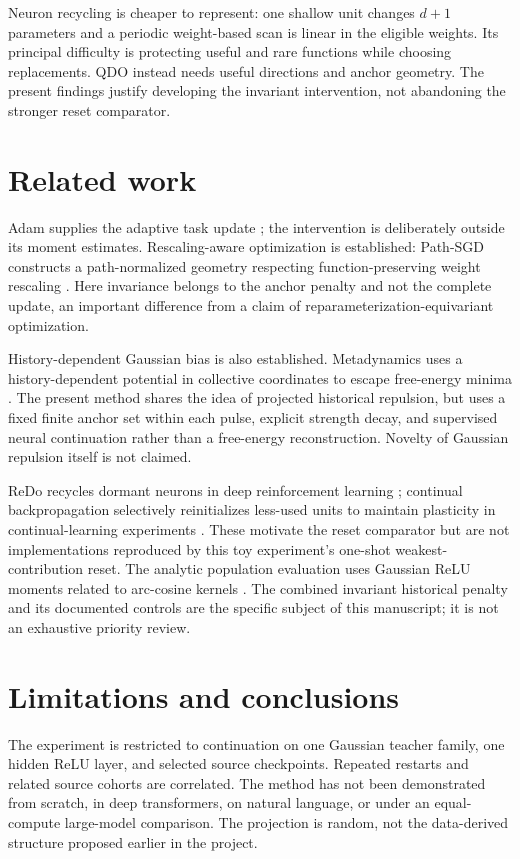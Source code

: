 \documentclass[11pt,letterpaper]{article}
\theoremstyle{remark}\newtheorem{remark}{Remark}
\begin{document}
Neuron recycling is cheaper to represent: one shallow unit changes $d+1$ parameters and a periodic weight-based scan is linear in the eligible weights. Its principal difficulty is protecting useful and rare functions while choosing replacements. QDO instead needs useful directions and anchor geometry. The present findings justify developing the invariant intervention, not abandoning the stronger reset comparator.

\section{Related work}
Adam supplies the adaptive task update \cite{adam}; the intervention is deliberately outside its moment estimates. Rescaling-aware optimization is established: Path-SGD constructs a path-normalized geometry respecting function-preserving weight rescaling \cite{pathsgd}. Here invariance belongs to the anchor penalty and not the complete update, an important difference from a claim of reparameterization-equivariant optimization.

History-dependent Gaussian bias is also established. Metadynamics uses a history-dependent potential in collective coordinates to escape free-energy minima \cite{metadynamics}. The present method shares the idea of projected historical repulsion, but uses a fixed finite anchor set within each pulse, explicit strength decay, and supervised neural continuation rather than a free-energy reconstruction. Novelty of Gaussian repulsion itself is not claimed.

ReDo recycles dormant neurons in deep reinforcement learning \cite{redo}; continual backpropagation selectively reinitializes less-used units to maintain plasticity in continual-learning experiments \cite{plasticity}. These motivate the reset comparator but are not implementations reproduced by this toy experiment's one-shot weakest-contribution reset. The analytic population evaluation uses Gaussian ReLU moments related to arc-cosine kernels \cite{arc}. The combined invariant historical penalty and its documented controls are the specific subject of this manuscript; it is not an exhaustive priority review.

\section{Limitations and conclusions}\label{sec:limits}
The experiment is restricted to continuation on one Gaussian teacher family, one hidden ReLU layer, and selected source checkpoints. Repeated restarts and related source cohorts are correlated. The method has not been demonstrated from scratch, in deep transformers, on natural language, or under an equal-compute large-model comparison. The projection is random, not the data-derived structure proposed earlier in the project.
\end{document}
